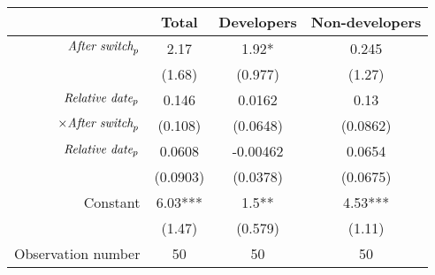 \begin{tabular}{|r|c|c|c|}
\hline
&  Total & Developers & Non-developers \\
\hline
$\mbox{\emph{After switch}}_p$ & 2.17 & 1.92* & 0.245 \\
 & (1.68) & (0.977) & (1.27) \\
\hline
$\mbox{\emph{Relative date}}_p$ & 0.146 & 0.0162 & 0.13 \\
$\times \mbox{\emph{After switch}}_p$ & (0.108) & (0.0648) & (0.0862) \\
\hline
$\mbox{\emph{Relative date}}_p$ & 0.0608 & -0.00462 & 0.0654 \\
 & (0.0903) & (0.0378) & (0.0675) \\
\hline
Constant & 6.03*** & 1.5** & 4.53*** \\
 & (1.47) & (0.579) & (1.11) \\
\hline
Observation number & 50 & 50 & 50 \\
\hline
\end{tabular}